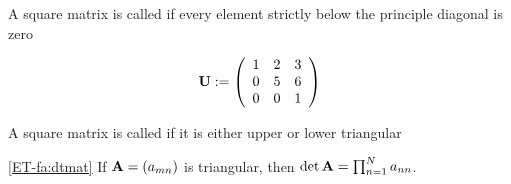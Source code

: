 \begin{frame}

    \vspace{2em}
    A square matrix is called  if every element
    strictly below the principle diagonal is zero

    \vspace{.7em}
    \Eg
    \begin{equation*}
        \mathbf U :=
        \left(
        \begin{array}{ccc}
            1 & 2 & 3  \\
            0 & 5 & 6 \\
            0 & 0 & 1
        \end{array}
        \right)
    \end{equation*}
    
    \vspace{.7em}
    A square matrix is called  if it is either upper or lower triangular

    \vspace{.7em}
    \Fact\eqref{ET-fa:dtmat}
    If $\mathbf A = (a_{mn})$ is triangular, then $\det \mathbf A = \prod_{n=1}^N a_{nn}$.
    
\end{frame}

